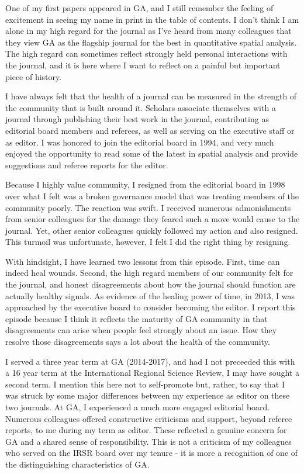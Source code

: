 \documentclass[11pt]{article}
\begin{document}
One of my first papers appeared in GA, and I still remember the feeling of
excitement in seeing my name in print in the table of contents. I don't think I
am alone in my high regard for the journal as I've heard from many colleagues
that they view GA as the flagship journal for the best in quantitative spatial
analysis. The high regard can sometimes reflect strongly held personal
interactions with the journal, and it is here where I want to reflect on a
painful but important piece of history.

I have always felt that the health of a journal can be measured in the strength
of the community that is built around it. Scholars associate themselves with a
journal through publishing their best work in the journal, contributing as
editorial board members and referees, as well as serving on the executive staff
or as editor. I was honored to join the editorial board in 1994, and very much
enjoyed the opportunity to read some of the latest in spatial analysis and
provide suggestions and referee reports for the editor.

Because I highly value community, I resigned from the editorial board in 1998
over what I felt was a broken governance model that was treating members of the
community poorly. The reaction was swift. I received numerous admonishments from
senior colleagues for the damage they feared such a move would cause to the
journal. Yet, other senior colleagues quickly followed my action and also resigned.
This turmoil was unfortunate, however, I felt I did the right thing by resigning.

With hindsight, I have learned two lessons from this episode. First, time can
indeed heal wounds. Second, the high regard members of our community felt for
the journal, and honest disagreements about how the journal should function are
actually healthy signals. As evidence of the healing power of time, in 2013, I
was approached by the executive board to consider becoming the editor. I report
this episode because I think it reflects the maturity of GA community in that
disagreements can arise when people feel strongly about an issue. How they
resolve those disagreements says a lot about the health of the community.

I served a three year term at GA (2014-2017), and had I not preceeded this with
a 16 year term at the International Regional Science Review, I may have sought a
second term. I mention this here not to self-promote but, rather, to say that I
was struck by some major differences between my experience as editor on these
two journals. At GA, I experienced a much more engaged editorial board. Numerous
colleagues offered constructive criticisms and support, beyond referee reports,
to me during my term as editor. These reflected a genuine concern for GA and a
shared sense of responsibility. This is not a criticism of my colleagues who
served on the IRSR board over my tenure - it is more a recognition of one of the
distinguishing characteristics of GA.
\end{document}
